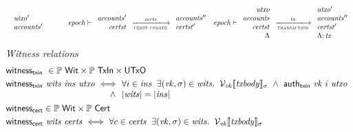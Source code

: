 \documentclass[11pt,a4paper]{article}
\begin{document}
\begin{figure}
\begin{equation*}
{\begin{array}{c}
\begin{array}{l}
    \var{utxo}^\prime \\
    \var{accounts}^\prime
  \end{array}
  \qquad\quad
  \var{epoch} \vdash
  \begin{array}{r}
    \var{accounts}^\prime \\
    \var{certst}
  \end{array}
  \transitionarrow{certs update}{\var{certs}}
  \begin{array}{l}
    \var{accounts}^{\prime\prime} \\
    \var{certst}^\prime
  \end{array}
  \end{array}
}{
  \var{epoch} \vdash
  \begin{array}{r}
    \var{utxo} \\
    \var{accounts} \\
    \var{certst} \\
    \Lambda
  \end{array}
  \transitionarrow{transaction}{\var{tx}}
  \begin{array}{l}
    \var{utxo}^\prime \\
    \var{accounts}^{\prime\prime} \\
    \var{certst}^\prime \\
    \Lambda ; \var{tx}
  \end{array}
}
\end{equation*}
%
\emph{Witness relations}
%
\begin{align*}
& \fun{witness_{txin}} ~ \in \powerset{\type{Wit}} \times \powerset{\type{TxIn}} \times \type{UTxO} \\
& \begin{array}[t]{@{}l@{~}r@{~}l}
  \fun{witness_{txin}} ~ \var{wits}~ \var{ins} ~ \var{utxo}
    & \iff & \forall i \in \var{ins} \;\;
             \exists (\var{vk}, \sigma) \in \var{wits}. \;\;
             \verified{\var{vk}}{\var{txbody}}{\sigma}
             \and \fun{auth_{txin}} ~ \var{vk} ~ i ~ \var{utxo} \\
    & \and & \size{\var{wits}} = \size{\var{ins}}
  \end{array}
\\
& \fun{witness_{cert}} \in \powerset{\type{Wit}} \times \powerset{\type{Cert}} \\
& \begin{array}[t]{@{}l@{~}r@{~}l}
  \fun{witness_{cert}} ~ \var{wits} ~ \var{certs}
    & \iff & \forall c \in \var{certs} \;\;
             \exists (\var{vk}, \sigma) \in \var{wits}. \;\;
             \verified{\var{vk}}{\var{txbody}}{\sigma}

\end{array}
\end{align*}
\end{figure}
\end{document}
